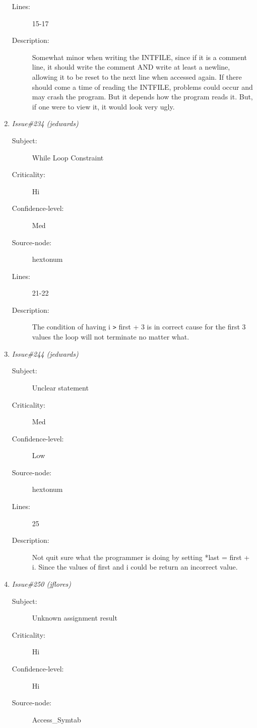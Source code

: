 \begin{enumerate}
\begin{description}
\item [Lines:] 15-17

\item [Description:] Somewhat minor when writing the INTFILE, since
if it is a comment line, it should write the comment AND write at least a
newline, allowing it to be reset to the next line when accessed again.  If
there should come a time of reading the INTFILE, problems could occur and may
crash the program.  But it depends how the program reads it.  But, if one
were to view it, it would look very ugly.
\end{description}
\item {\it Issue\#234 (jedwards)}
\begin{description}
\item [Subject:] While Loop Constraint
\item [Criticality:] Hi
\item [Confidence-level:] Med
\item [Source-node:] hextonum

\item [Lines:] 21-22

\item [Description:] The condition of having i {\tt >} first + 3 is in
correct cause for the first 3 values the loop will not terminate no matter
what.
\end{description}
\item {\it Issue\#244 (jedwards)}
\begin{description}
\item [Subject:] Unclear statement
\item [Criticality:] Med
\item [Confidence-level:] Low
\item [Source-node:] hextonum

\item [Lines:] 25

\item [Description:] Not quit sure what the programmer is doing by
setting *last = first + i.  Since the values of first and i could be return
an incorrect value.
\end{description}
\item {\it Issue\#250 (jflores)}
\begin{description}
\item [Subject:] Unknown assignment result
\item [Criticality:] Hi
\item [Confidence-level:] Hi
\item [Source-node:] Access\_Symtab


\end{description}
\end{enumerate}
